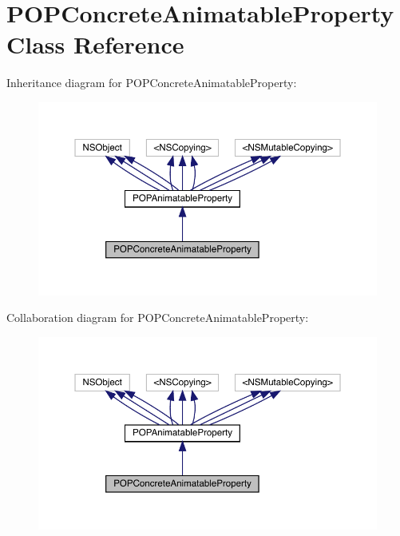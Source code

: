 \hypertarget{interface_p_o_p_concrete_animatable_property}{}\section{P\+O\+P\+Concrete\+Animatable\+Property Class Reference}
\label{interface_p_o_p_concrete_animatable_property}


Inheritance diagram for P\+O\+P\+Concrete\+Animatable\+Property\+:\nopagebreak
\begin{figure}[H]
\begin{center}
\leavevmode
\includegraphics[width=350pt]{interface_p_o_p_concrete_animatable_property__inherit__graph}
\end{center}
\end{figure}


Collaboration diagram for P\+O\+P\+Concrete\+Animatable\+Property\+:\nopagebreak
\begin{figure}[H]
\begin{center}
\leavevmode
\includegraphics[width=350pt]{interface_p_o_p_concrete_animatable_property__coll__graph}
\end{center}
\end{figure}
